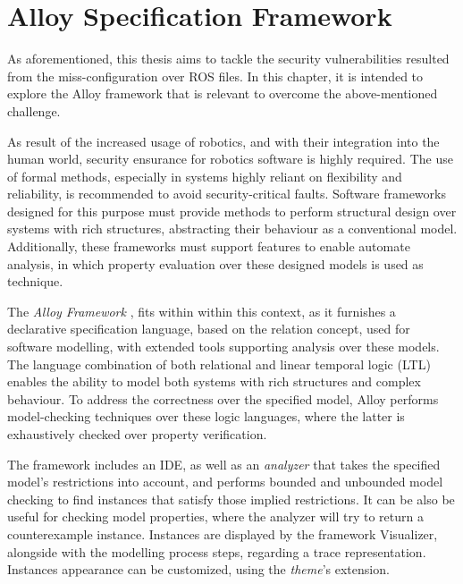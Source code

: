 \chapter{Alloy Specification Framework}\label{c:alloy}

As aforementioned, this thesis aims to tackle the security vulnerabilities resulted from the miss-configuration over ROS files. In this chapter, it is intended to explore the Alloy framework that is relevant to overcome the above-mentioned challenge. %

As result of the increased usage of robotics, and with their integration into the human world, security ensurance for robotics software is highly required. The use of formal methods, especially in systems highly reliant on flexibility and reliability, is recommended to avoid security-critical faults. \cite{carvalho2020analysis} Software frameworks designed for this purpose must provide methods to perform structural design over systems with rich structures, abstracting their behaviour as a conventional model. Additionally, these frameworks must support features to enable automate analysis, in which property evaluation over these designed models is used as technique. 

The \textit{Alloy Framework} \cite{alloy-DJ}, fits within within this context, as it furnishes a declarative specification language, based on the relation concept, used for software modelling, with extended tools supporting analysis over these models. \cite{alloy-6} The language combination of both relational and linear temporal logic (LTL) enables the ability to model both systems with rich structures and complex behaviour. To address the correctness over the specified model, Alloy performs model-checking techniques over these logic languages, where the latter is exhaustively checked over property verification. \cite{lwspecification, carvalho2020analysis}

The framework includes an IDE, as well as an \textit{analyzer} that takes the specified model's restrictions into account, and performs bounded and unbounded model checking to find instances that satisfy those implied restrictions. It can be also be useful for checking model properties, where the analyzer will try to return a counterexample instance. Instances are displayed by the framework Visualizer, alongside with the modelling process steps, regarding a trace representation. Instances appearance can be customized, using the \textit{theme}'s extension. \cite{alloy-6}

